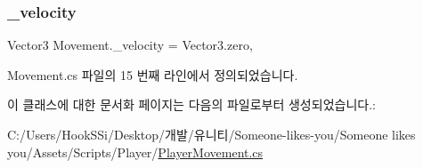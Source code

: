 \subsubsection{\texorpdfstring{\_velocity}{\_velocity}}
{\footnotesize\ttfamily Vector3 Movement.\+\_\+velocity = Vector3.\+zero\hspace{0.3cm}{\ttfamily [protected]}, {\ttfamily [inherited]}}



Movement.\+cs 파일의 15 번째 라인에서 정의되었습니다.



이 클래스에 대한 문서화 페이지는 다음의 파일로부터 생성되었습니다.\+:\begin{DoxyCompactItemize}
\item 
C\+:/\+Users/\+Hook\+S\+Si/\+Desktop/개발/유니티/\+Someone-\/likes-\/you/\+Someone likes you/\+Assets/\+Scripts/\+Player/\mbox{\hyperlink{_player_movement_8cs}{Player\+Movement.\+cs}}\end{DoxyCompactItemize}
